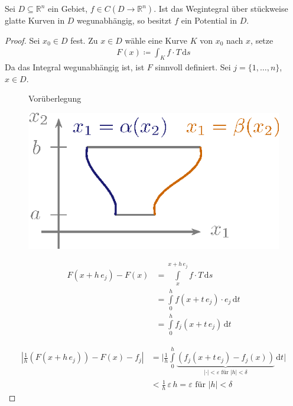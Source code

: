 \documentclass[a4paper,10pt]{scrbook}
\begin{document}
\begin{theorem}[Satz]
  Sei $D \subseteq \mathbb{R}^n$ ein Gebiet, $f \in C(D \to \mathbb{R}^n)$. Ist das Wegintegral über stückweise glatte Kurven in $D$ wegunabhängig, so besitzt $f$ ein Potential in $D$.

  \begin{proof}
    Sei $x_0 \in D$ fest. Zu $x \in D$ wähle eine Kurve $K$ von $x_0$ nach $x$, setze
    \begin{align*}
      F(x) \coloneq \int_K f \cdot T \, \mathrm{d}s
    \end{align*}
    Da das Integral wegunabhängig ist, ist $F$ sinnvoll definiert. Sei $j = \{1,\ldots,n\}$, $x \in D$.

    \begin{figure}[H]
      Vorüberlegung

      \centering
      \includegraphics[scale=0.2]{images/ana3-tmp-57}
    \end{figure}

    \begin{align*}
      F(x + h \, e_j) - F(x)
      &= \int\limits_{x}^{x + h \, e_j} f \cdot T \, \mathrm{d}s \\
      &= \int\limits_{0}^{h} f(x + t \, e_j) \cdot e_j \, \mathrm{d}t \\
      &= \int\limits_{0}^{h} f_j(x + t \, e_j) \, \mathrm{d}t
    \end{align*}

    \begin{align*}
      \left| \frac{1}{h} ( F(x + h \, e_j) ) - F(x) - f_j \right|
      &= \bigg| \frac{1}{h} \int\limits_{0}^{h} \underbrace{\left( f_j(x + t \, e_j) - f_j(x) \right)}_{|\cdot| < \varepsilon \text{ für } |h| < \delta} \, \mathrm{d}t \bigg| \\
      &< \frac{1}{h} \, \varepsilon \, h = \varepsilon \text{ für } |h| < \delta
    \end{align*}
  \end{proof}
\end{theorem}
\end{document}
